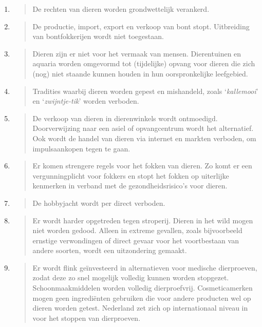 \begin{enumerate}
\def\labelenumi{\arabic{enumi}.}
\item
  \begin{quote}
  De rechten van dieren worden grondwettelijk verankerd.
  \end{quote}
\item
  \begin{quote}
  De productie, import, export en verkoop van bont stopt. Uitbreiding
  van bontfokkerijen wordt niet toegestaan.
  \end{quote}
\item
  \begin{quote}
  Dieren zijn er niet voor het vermaak van mensen. Dierentuinen en
  aquaria worden omgevormd tot (tijdelijke) opvang voor dieren die zich
  (nog) niet staande kunnen houden in hun oorspronkelijke leefgebied.
  \end{quote}
\item
  \begin{quote}
  Tradities waarbij dieren worden gepest en mishandeld, zoals
  `\emph{kallemooi}' en `\emph{zwijntje-tik}' worden verboden.
  \end{quote}
\item
  \begin{quote}
  De verkoop van dieren in dierenwinkels wordt ontmoedigd.
  Doorverwijzing naar een asiel of opvangcentrum wordt het alternatief.
  Ook wordt de handel van dieren via internet en markten verboden, om
  impulsaankopen tegen te gaan.
  \end{quote}
\item
  \begin{quote}
  Er komen strengere regels voor het fokken van dieren. Zo komt er een
  vergunningplicht voor fokkers en stopt het fokken op uiterlijke
  kenmerken in verband met de gezondheidsrisico's voor dieren.
  \end{quote}
\item
  \begin{quote}
  De hobbyjacht wordt per direct verboden.
  \end{quote}
\item
  \begin{quote}
  Er wordt harder opgetreden tegen stroperij. Dieren in het wild mogen
  niet worden gedood. Alleen in extreme gevallen, zoals bijvoorbeeld
  ernstige verwondingen of direct gevaar voor het voortbestaan van
  andere soorten, wordt een uitzondering gemaakt.
  \end{quote}
\item
  \begin{quote}
  Er wordt flink geïnvesteerd in alternatieven voor medische
  dierproeven, zodat deze zo snel mogelijk volledig kunnen worden
  stopgezet. Schoonmaakmiddelen worden volledig dierproefvrij.
  Cosmeticamerken mogen geen ingrediënten gebruiken die voor andere
  producten wel op dieren worden getest. Nederland zet zich op
  internationaal niveau in voor het stoppen van dierproeven.
  \end{quote}
\end{enumerate}

